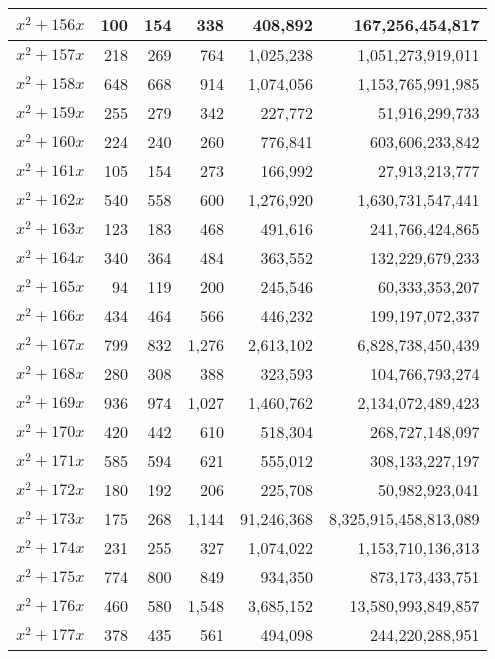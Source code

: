 \documentclass[a4paper]{amsproc}
\theoremstyle{plain}
\begin{document}
\begin{longtable}{ | l | r | r | r | r | r | }
$x^2 + 156x$ & 100 & 154 & 338 & 408{,}892 & 167{,}256{,}454{,}817 \\ \hline
$x^2 + 157x$ & 218 & 269 & 764 & 1{,}025{,}238 & 1{,}051{,}273{,}919{,}011 \\ \hline
$x^2 + 158x$ & 648 & 668 & 914 & 1{,}074{,}056 & 1{,}153{,}765{,}991{,}985 \\ \hline
$x^2 + 159x$ & 255 & 279 & 342 & 227{,}772 & 51{,}916{,}299{,}733 \\ \hline
$x^2 + 160x$ & 224 & 240 & 260 & 776{,}841 & 603{,}606{,}233{,}842 \\ \hline
$x^2 + 161x$ & 105 & 154 & 273 & 166{,}992 & 27{,}913{,}213{,}777 \\ \hline
$x^2 + 162x$ & 540 & 558 & 600 & 1{,}276{,}920 & 1{,}630{,}731{,}547{,}441 \\ \hline
$x^2 + 163x$ & 123 & 183 & 468 & 491{,}616 & 241{,}766{,}424{,}865 \\ \hline
$x^2 + 164x$ & 340 & 364 & 484 & 363{,}552 & 132{,}229{,}679{,}233 \\ \hline
$x^2 + 165x$ & 94 & 119 & 200 & 245{,}546 & 60{,}333{,}353{,}207 \\ \hline
$x^2 + 166x$ & 434 & 464 & 566 & 446{,}232 & 199{,}197{,}072{,}337 \\ \hline
$x^2 + 167x$ & 799 & 832 & 1{,}276 & 2{,}613{,}102 & 6{,}828{,}738{,}450{,}439 \\ \hline
$x^2 + 168x$ & 280 & 308 & 388 & 323{,}593 & 104{,}766{,}793{,}274 \\ \hline
$x^2 + 169x$ & 936 & 974 & 1{,}027 & 1{,}460{,}762 & 2{,}134{,}072{,}489{,}423 \\ \hline
$x^2 + 170x$ & 420 & 442 & 610 & 518{,}304 & 268{,}727{,}148{,}097 \\ \hline
$x^2 + 171x$ & 585 & 594 & 621 & 555{,}012 & 308{,}133{,}227{,}197 \\ \hline
$x^2 + 172x$ & 180 & 192 & 206 & 225{,}708 & 50{,}982{,}923{,}041 \\ \hline
$x^2 + 173x$ & 175 & 268 & 1{,}144 & 91{,}246{,}368 & 8{,}325{,}915{,}458{,}813{,}089 \\ \hline
$x^2 + 174x$ & 231 & 255 & 327 & 1{,}074{,}022 & 1{,}153{,}710{,}136{,}313 \\ \hline
$x^2 + 175x$ & 774 & 800 & 849 & 934{,}350 & 873{,}173{,}433{,}751 \\ \hline
$x^2 + 176x$ & 460 & 580 & 1{,}548 & 3{,}685{,}152 & 13{,}580{,}993{,}849{,}857 \\ \hline
$x^2 + 177x$ & 378 & 435 & 561 & 494{,}098 & 244{,}220{,}288{,}951 \\ \hline

\end{longtable}
\end{document}
